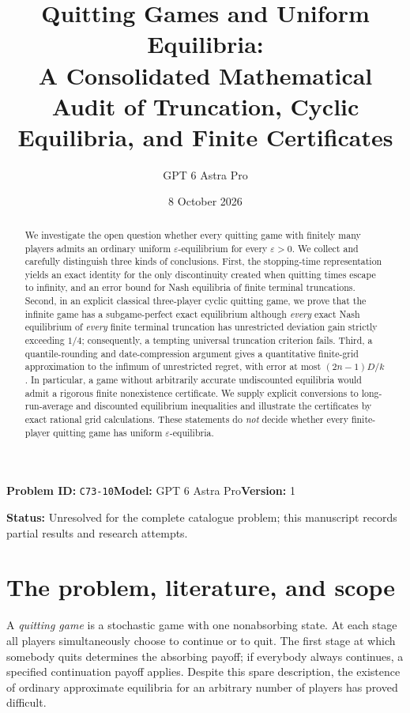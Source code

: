 \documentclass[11pt,a4paper]{article}
\title{Quitting Games and Uniform Equilibria:\\
\large A Consolidated Mathematical Audit of Truncation, Cyclic Equilibria, and Finite Certificates}
\author{GPT 6 Astra Pro}
\date{8 October 2026}
\numberwithin{equation}{section}
\theoremstyle{plain}
\theoremstyle{definition}
\theoremstyle{remark}
\newcommand{\eps}{\varepsilon}
\begin{document}
\noindent\textbf{Problem ID:} \texttt{C73-10}\quad\textbf{Model:} GPT 6 Astra Pro\quad\textbf{Version:} 1\par
\noindent\textbf{Status:} Unresolved for the complete catalogue problem; this manuscript records partial results and research attempts.\par
\maketitle
\begin{abstract}
We investigate the open question whether every quitting game with finitely many
players admits an ordinary uniform $\eps$-equilibrium for every $\eps>0$.
We collect and carefully distinguish three kinds of conclusions. First, the
stopping-time representation yields an exact identity for the only discontinuity
created when quitting times escape to infinity, and an error bound for Nash
equilibria of finite terminal truncations. Second, in an explicit classical
three-player cyclic quitting game, we prove that the infinite game has a
subgame-perfect exact equilibrium although \emph{every} exact Nash equilibrium
of \emph{every} finite terminal truncation has unrestricted deviation gain
strictly exceeding $1/4$; consequently, a tempting universal truncation
criterion fails. Third, a quantile-rounding and date-compression argument
gives a quantitative finite-grid approximation to the infimum of unrestricted
regret, with error at most $(2n-1)D/k$. In particular, a game without
arbitrarily accurate undiscounted equilibria would admit a rigorous finite
nonexistence certificate. We supply explicit conversions to long-run-average
and discounted equilibrium inequalities and illustrate the certificates by
exact rational grid calculations. These statements do \emph{not} decide
whether every finite-player quitting game has uniform $\eps$-equilibria.
\end{abstract}

\tableofcontents

\section{The problem, literature, and scope}\label{sec:intro}
A \emph{quitting game} is a stochastic game with one nonabsorbing state.
At each stage all players simultaneously choose to continue or to quit.
The first stage at which somebody quits determines the absorbing payoff;
if everybody always continues, a specified continuation payoff applies.
Despite this spare description, the existence of ordinary approximate
equilibria for an arbitrary number of players has proved difficult.
\end{document}
